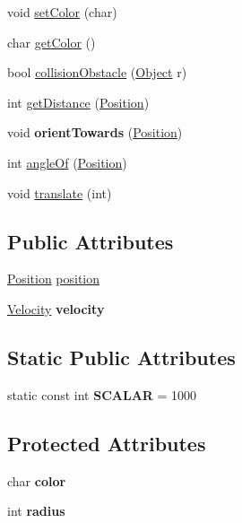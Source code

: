 \begin{DoxyCompactItemize}
\item 
void \hyperlink{classObject_a627ab558ee01d1cb6865ff4f60f5568b}{set\-Color} (char)
\item 
char \hyperlink{classObject_a7d16042d20401814b7d2922ca1023aa3}{get\-Color} ()
\item 
bool \hyperlink{classObject_ab75112940a2a3941b9856529f283e9a8}{collision\-Obstacle} (\hyperlink{classObject}{Object} r)
\item 
int \hyperlink{classObject_aed0e66208e6a5c4595f20e32041917de}{get\-Distance} (\hyperlink{structPosition}{Position})
\item 
\hypertarget{classObject_a5d95415c2e3fe9ab7fdc1a2d2f85c6d7}{void {\bfseries orient\-Towards} (\hyperlink{structPosition}{Position})}\label{classObject_a5d95415c2e3fe9ab7fdc1a2d2f85c6d7}

\item 
int \hyperlink{classObject_a3c70fb123af0439b5d1c916ca74237a8}{angle\-Of} (\hyperlink{structPosition}{Position})
\item 
void \hyperlink{classObject_ac1894a4a885cb94ccd25fb3291599153}{translate} (int)
\end{DoxyCompactItemize}
\subsection*{Public Attributes}
\begin{DoxyCompactItemize}
\item 
\hyperlink{structPosition}{Position} \hyperlink{classObject_ad5b0ba88b937905bd86696917b252b8b}{position}
\item 
\hypertarget{classObject_a9f84fc31e8a08359d432ff7beb146501}{\hyperlink{structVelocity}{Velocity} {\bfseries velocity}}\label{classObject_a9f84fc31e8a08359d432ff7beb146501}

\end{DoxyCompactItemize}
\subsection*{Static Public Attributes}
\begin{DoxyCompactItemize}
\item 
\hypertarget{classObject_aa8fc90771d9d3dce661deb5ee14662a8}{static const int {\bfseries S\-C\-A\-L\-A\-R} = 1000}\label{classObject_aa8fc90771d9d3dce661deb5ee14662a8}

\end{DoxyCompactItemize}
\subsection*{Protected Attributes}
\begin{DoxyCompactItemize}
\item 
\hypertarget{classObject_a6937bdcbc9efbcc6ed7347243819ed77}{char {\bfseries color}}\label{classObject_a6937bdcbc9efbcc6ed7347243819ed77}

\item 
\hypertarget{classObject_abb2dc186dcec09160e6211e84120f0a5}{int {\bfseries radius}}\label{classObject_abb2dc186dcec09160e6211e84120f0a5}

\end{DoxyCompactItemize}



